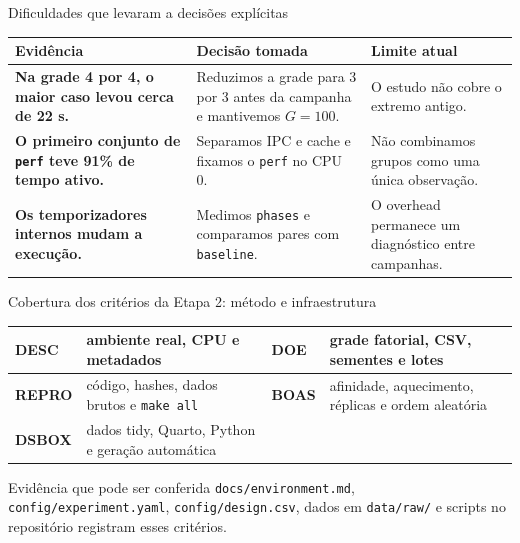 \documentclass[aspectratio=169,11pt]{beamer}
\begin{document}
\begin{frame}{Dificuldades que levaram a decisões explícitas}
    \renewcommand{\arraystretch}{1.27}
    \begin{tabularx}{\textwidth}{>{\bfseries}p{} X X}
        Evidência & Decisão tomada & Limite atual \\
        \hline
        Na grade 4 por 4, o maior caso levou cerca de 22 s. & Reduzimos a grade para 3 por 3 antes da campanha e mantivemos $G=100$. & O estudo não cobre o extremo antigo. \\
        \hline
        O primeiro conjunto de \texttt{perf} teve 91\% de tempo ativo. & Separamos IPC e cache e fixamos o \texttt{perf} no CPU 0. & Não combinamos grupos como uma única observação. \\
        \hline
        Os temporizadores internos mudam a execução. & Medimos \texttt{phases} e comparamos pares com \texttt{baseline}. & O overhead permanece um diagnóstico entre campanhas. \\
    \end{tabularx}
\end{frame}

\begin{frame}{Cobertura dos critérios da Etapa 2: método e infraestrutura}
    \renewcommand{\arraystretch}{1.28}
    \begin{tabularx}{\textwidth}{>{\bfseries}p{} X >{\bfseries}p{} X}
        DESC & ambiente real, CPU e metadados & DOE & grade fatorial, CSV, sementes e lotes \\
        \hline
        REPRO & código, hashes, dados brutos e \texttt{make all} & BOAS & afinidade, aquecimento, réplicas e ordem aleatória \\
        \hline
        DSBOX & dados tidy, Quarto, Python e geração automática & & \\
    \end{tabularx}
    \vspace{0.30cm}
    \begin{questionbox}{Evidência que pode ser conferida}
        \texttt{docs/environment.md}, \texttt{config/experiment.yaml}, \texttt{config/design.csv},
        dados em \texttt{data/raw/} e scripts no repositório registram esses critérios.
    \end{questionbox}
\end{frame}
\end{document}
